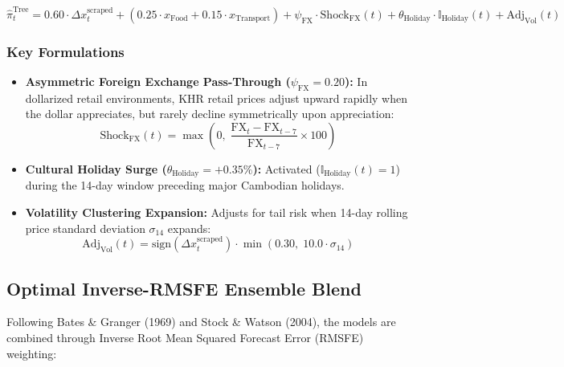 \documentclass[11pt,a4paper]{article}
\begin{document}
\begin{formulabox}
\begin{equation}
    \hat{\pi}_t^{\text{Tree}} = 0.60 \cdot \Delta x_t^{\text{scraped}} + \left( 0.25 \cdot x_{\text{Food}} + 0.15 \cdot x_{\text{Transport}} \right) + \psi_{\text{FX}} \cdot \text{Shock}_{\text{FX}}(t) + \theta_{\text{Holiday}} \cdot \mathbb{I}_{\text{Holiday}}(t) + \text{Adj}_{\text{Vol}}(t)
\end{equation}
\end{formulabox}

\subsubsection*{Key Formulations}
\begin{itemize}
    \item \textbf{Asymmetric Foreign Exchange Pass-Through ($\psi_{\text{FX}} = 0.20$):} In dollarized retail environments, KHR retail prices adjust upward rapidly when the dollar appreciates, but rarely decline symmetrically upon appreciation:
    \begin{equation}
        \text{Shock}_{\text{FX}}(t) = \max\left( 0, \; \frac{\text{FX}_t - \text{FX}_{t-7}}{\text{FX}_{t-7}} \times 100 \right)
    \end{equation}
    \item \textbf{Cultural Holiday Surge ($\theta_{\text{Holiday}} = +0.35\%$):} Activated ($\mathbb{I}_{\text{Holiday}}(t) = 1$) during the 14-day window preceding major Cambodian holidays.
    \item \textbf{Volatility Clustering Expansion:} Adjusts for tail risk when 14-day rolling price standard deviation $\sigma_{14}$ expands:
    \begin{equation}
        \text{Adj}_{\text{Vol}}(t) = \text{sign}\left(\Delta x_t^{\text{scraped}}\right) \cdot \min\left(0.30, \; 10.0 \cdot \sigma_{14}\right)
    \end{equation}
\end{itemize}

\subsection{Optimal Inverse-RMSFE Ensemble Blend}

Following Bates \& Granger (1969) and Stock \& Watson (2004), the models are combined through Inverse Root Mean Squared Forecast Error (RMSFE) weighting:
\end{document}
